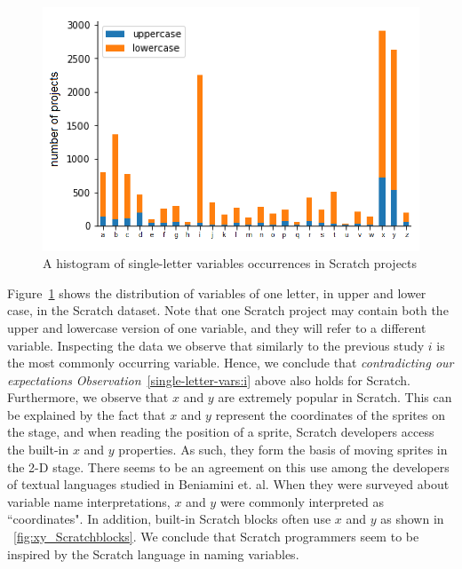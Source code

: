 \documentclass[conference]{IEEEtran}
\begin{document}
\begin{figure}[tb]
	\begin{center}
		\includegraphics[width=0.95\columnwidth]{fig/project/varname_singleletter-project}
		\caption{A histogram of single-letter variables occurrences in Scratch projects }
		\label{fig:one_letter_occurrence}
	\end{center}
\end{figure} 
Figure~\ref{fig:one_letter_occurrence} shows the distribution of variables of one letter, in upper and lower case, in the Scratch dataset. Note that one Scratch project may contain both the upper and lowercase version of one variable, and they will refer to a different variable. Inspecting the data we observe that similarly to the previous study $i$ is the most commonly occurring variable. 
Hence, we conclude that \emph{contradicting our expectations} \emph{Observation}~\ref{single-letter-vars:i} above also holds for Scratch.
Furthermore, we observe that $x$ and $y$ are extremely popular in Scratch. This can be explained by the fact that $x$ and $y$ represent the coordinates of the sprites on the stage, and when reading the position of a sprite, Scratch developers access the built-in $x$ and $y$ properties. As such, they form the basis of moving sprites in the 2-D stage. There seems to be an agreement on this use among the developers of textual languages studied in Beniamini et. al. When they were surveyed about variable name interpretations, $x$ and $y$ were commonly interpreted as ``coordinates". In addition, built-in Scratch blocks often use $x$ and $y$ as shown in \figurename{~\ref{fig:xy_Scratchblocks}}. 
We conclude that Scratch programmers seem to be inspired by the Scratch language in naming variables.  
\end{document}
